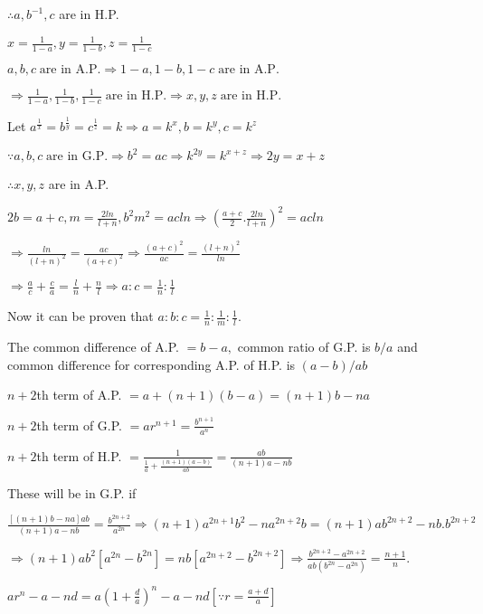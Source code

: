   $\therefore a, b^{-1}, c$ are in H.P.
\item $x = \frac{1}{1 - a}, y = \frac{1}{1 - b}, z = \frac{1}{1 - c}$

  $a, b, c\;\text{are in A.P.}\Rightarrow 1 - a, 1 - b, 1 - c\;\text{are in A.P.}$

  $\Rightarrow \frac{1}{1 - a}, \frac{1}{1 - b}, \frac{1}{1 - c}\;\text{are in H.P.}\Rightarrow x, y,
  z\;\text{are in H.P.}$
\item Let $a^{\frac{1}{x}} = b^{\frac{1}{y}} = c^{\frac{1}{z}} = k\Rightarrow a = k^x, b = k^y, c = k^z$

  $\because a, b, c \;\text{are in G.P.} \Rightarrow b^2 = ac \Rightarrow k^{2y} = k^{x + z} \Rightarrow 2y =
  x + z$

  $\therefore x, y, z$ are in A.P.
\item $2b = a + c, m = \frac{2ln}{l + n}, b^2m^2 = acln\Rightarrow \left(\frac{a + c}{2}.\frac{2ln}{l +
  n}\right)^2 = acln$

  $\Rightarrow \frac{ln}{(l + n)^2} = \frac{ac}{(a + c)^2}\Rightarrow \frac{(a + c)^2}{ac} = \frac{(l +
  n)^2}{ln}$

  $\Rightarrow \frac{a}{c} + \frac{c}{a} = \frac{l}{n} + \frac{n}{l}\Rightarrow a:c =
  \frac{1}{n}:\frac{1}{l}$

  Now it can be proven that $a:b:c = \frac{1}{n}:\frac{1}{m}:\frac{1}{l}$.
\item The common difference of A.P. $= b - a,$ common ratio of G.P. is $b/a$ and common difference for corresponding
  A.P. of H.P. is $(a - b)/ab$

  $n + 2$th term of A.P. $= a + (n + 1)(b - a) = (n + 1)b - na$

  $n + 2$th term of G.P. $= ar^{n + 1} = \frac{b^{n + 1}}{a^n}$

  $n + 2$th term of H.P. $= \frac{1}{\frac{1}{a} + \frac{(n + 1)(a - b)}{ab}} = \frac{ab}{(n + 1)a - nb}$

  These will be in G.P. if

  $\frac{[(n + 1)b - na]ab}{(n + 1)a - nb} = \frac{b^{2n + 2}}{a^{2n}}\Rightarrow (n + 1)a^{2n + 1}b^2 -
  na^{2n + 2}b = (n + 1)ab^{2n + 2} - nb.b^{2n + 2}$

  $\Rightarrow (n + 1)ab^2[a^{2n} - b^{2n}] = nb[a^{2n + 2} - b^{2n + 2}]\Rightarrow \frac{b^{2n + 2} -
    a^{2n + 2}}{ab(b^{2n} - a^{2n})} = \frac{n + 1}{n}$.
\item $ar^n - a - nd = a\left(1 + \frac{d}{a}\right)^n - a - nd\left[\because r = \frac{a + d}{a}\right]$

